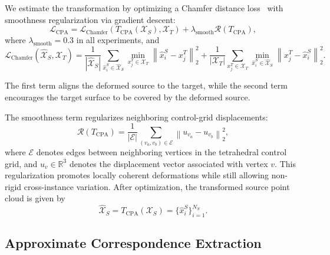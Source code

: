 We estimate the transformation by optimizing a Chamfer distance loss~\cite{fan2017chamfer} with smoothness regularization via gradient descent:
\begin{equation}
\label{eq:cpa_objective}
\mathcal{L}_{\mathrm{CPA}}
=
\mathcal{L}_{\mathrm{Chamfer}}
\left(
T_{\mathrm{CPA}}(\mathcal{X}_S),
\mathcal{X}_T
\right)
+
\lambda_{\mathrm{smooth}}
\mathcal{R}(T_{\mathrm{CPA}}),
\end{equation}
where \(\lambda_{\mathrm{smooth}} = 0.3\) in all experiments, and 
\begin{equation}
\label{eq:chamfer_loss}
\mathcal{L}_{\mathrm{Chamfer}}
(\widehat{\mathcal{X}}_S,\mathcal{X}_T)
=
\frac{1}{|\widehat{\mathcal{X}}_S|}
\sum_{\hat{x}_i^S \in \widehat{\mathcal{X}}_S}
\min_{x_j^T \in \mathcal{X}_T}
\left\|
\hat{x}_i^S-x_j^T
\right\|_2^2
+
\frac{1}{|\mathcal{X}_T|}
\sum_{x_j^T \in \mathcal{X}_T}
\min_{\hat{x}_i^S \in \widehat{\mathcal{X}}_S}
\left\|
x_j^T-\hat{x}_i^S
\right\|_2^2 .
\end{equation}

The first term aligns the deformed source to the target, while the second term encourages the target surface to be covered by the deformed source.

The smoothness term regularizes neighboring control-grid displacements:
\begin{equation}
\label{eq:cpa_smoothness}
\mathcal{R}(T_{\mathrm{CPA}})
=
\frac{1}{|\mathcal{E}|}
\sum_{(v_a,v_b)\in\mathcal{E}}
\left\|
u_{v_a}-u_{v_b}
\right\|_2^2,
\end{equation}
where \(\mathcal{E}\) denotes edges between neighboring vertices
in the tetrahedral control grid, and \(u_v\in\mathbb{R}^3\)
denotes the displacement vector associated with vertex \(v\).
This regularization promotes locally coherent deformations while
still allowing non-rigid cross-instance variation.
%
After optimization, the transformed source point cloud is given by
\begin{equation}
\label{eq:deformed_source}
\widehat{\mathcal{X}}_S
=
T_{\mathrm{CPA}}(\mathcal{X}_S)
=
\{\hat{x}_i^S\}_{i=1}^{N_S}.
\end{equation}



\subsection{Approximate Correspondence Extraction}
\label{sec:establish_correspondences}

